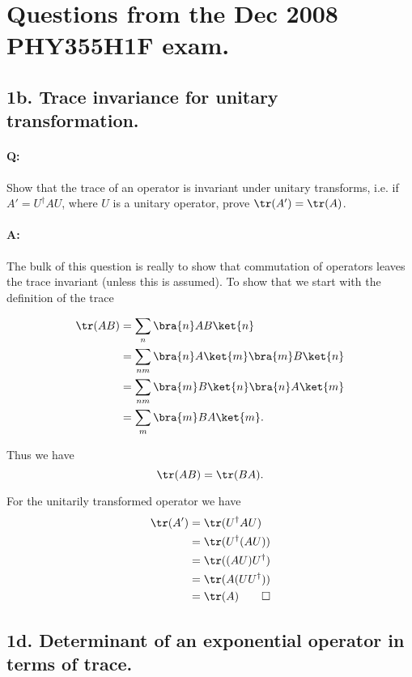 \section{Questions from the Dec 2008 PHY355H1F exam.}

\subsection{1b. Trace invariance for unitary transformation.}

\paragraph{Q:} Show that the trace of an operator is invariant under unitary transforms, i.e. if $A' = U^\dagger A U$, where $U$ is a unitary operator, prove $\tr(A') = \tr(A)$.

\paragraph{A:} 

The bulk of this question is really to show that commutation of operators leaves the trace invariant (unless this is assumed).  To show that we start with the definition of the trace

\begin{align*}
\tr(AB) 
&= \sum_n \bra{n} A B \ket{n} \\
&= \sum_{n m} \bra{n} A \ket{m} \bra{m} B \ket{n} \\
&= \sum_{n m} 
\bra{m} B \ket{n} 
\bra{n} A \ket{m} 
\\
&= \sum_{m} \bra{m} B A \ket{m}.
\end{align*}

Thus we have
\begin{equation}\label{eqn:qmIexamPractice2008Dec:1b:10}
\tr(A B) = \tr( B A ).
\end{equation}

For the unitarily transformed operator we have
\begin{align*}
\tr(A') 
&= \tr( U^\dagger A U ) \\
&= \tr( U^\dagger (A U) ) \\
&= \tr( (A U) U^\dagger ) \\
&= \tr( A (U U^\dagger) ) \\
&= \tr( A ) \qquad \square
\end{align*}

\subsection{1d.  Determinant of an exponential operator in terms of trace.}

